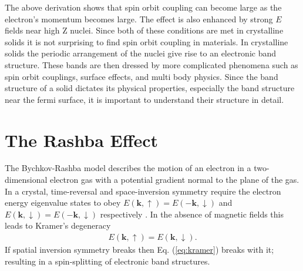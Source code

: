 \documentclass[12pt]{article}
\begin{document}
The above derivation shows that spin orbit coupling can become large as the electron's momentum becomes large.
The effect is also enhanced by strong $E$ fields near high Z nuclei.
Since both of these conditions are met in crystalline solids it is not surprising to find spin orbit coupling in materials.
In crystalline solids the periodic arrangement of the nuclei give rise to an electronic band structure.
These bands are then dressed by more complicated phenomena such as spin orbit couplings, surface effects, and multi body physics.
Since the band structure of a solid dictates its physical properties, especially the band structure near the fermi surface, it is important to understand their structure in detail.

\section{The Rashba Effect}
The Bychkov-Rashba model describes the motion of an electron in a two-dimensional electron gas with a potential gradient normal to the plane of the gas\cite{Rashba}.
In a crystal, time-reversal and space-inversion symmetry require the electron energy eigenvalue states to obey $E(\boldsymbol{k},\uparrow)=E(-\boldsymbol{k},\downarrow)$ and $E(\boldsymbol{k},\downarrow)=E(-\boldsymbol{k},\downarrow)$ respectively \cite{Okuda-Kimura}.
In the absence of magnetic fields this leads to Kramer's degeneracy
\begin{align}
  \label{eq:kramer}
  E(\boldsymbol{k},\uparrow)=E(\boldsymbol{k},\downarrow)\text{.}
\end{align}
If spatial inversion symmetry breaks then Eq. (\ref{eq:kramer}) breaks with it; resulting in a spin-splitting of electronic band structures\cite{Winkler}.
\end{document}
